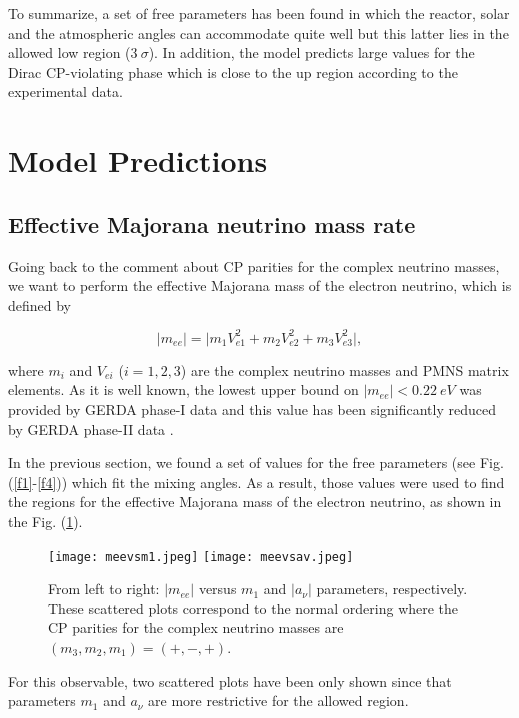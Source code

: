 \documentclass[aps,prd,groupaddress,floatfix,tighten,nofootinbib,showpacs,amsfonts,superscriptaddress]{revtex4-2}
\begin{document}
To summarize, a set of free parameters has been found in which the reactor, solar and the atmospheric angles can accommodate quite well but this latter lies in the allowed low region ($3~\sigma$). In addition, the model predicts large values for the Dirac CP-violating phase which is close to the up region according to the experimental data.




  
\section{Model Predictions}

\subsection{Effective Majorana neutrino mass rate}

Going back to the comment about CP parities for the complex neutrino masses, we want to perform the effective Majorana mass of the electron neutrino, which is defined by

\begin{equation}
	\vert m_{ee}\vert=\vert m_{1} V^{2}_{e1}+ m_{2} V^{2}_{e2}+ m_{3} V^{2}_{e3}\vert,
\end{equation}

where $m_{i}$ and $V_{ei}$ ($i=1,2,3$) are the complex neutrino masses and PMNS matrix elements. As it is well known,  the lowest upper bound on $|m_{ee}|<0.22~eV$ was provided
by GERDA phase-I data \cite{Agostini:2013mzu} and this value has been significantly reduced by GERDA phase-II data \cite{Agostini:2017iyd}. 

In the previous section, we found a set of values for the free parameters (see Fig. (\ref{f1}-\ref{f4})) which fit the mixing angles. As a result, those values were used to find
the regions for the effective Majorana mass of the electron neutrino, as shown in the Fig. (\ref{f5}).
\begin{figure}[h!]\centering
	\texttt{[image: meevsm1.jpeg]}
	\hspace{1mm}\texttt{[image: meevsav.jpeg]}
	\caption{From left to right: $\vert m_{ee}\vert$ versus $m_{1}$ and $\vert a_{\nu} \vert$ parameters, respectively. These scattered plots correspond to the normal ordering where the CP parities for the complex neutrino masses are $(m_{3}, m_{2}, m_{1})=(+,-,+)$.}\label{f5}
\end{figure}
For this observable, two scattered plots have been only shown since that parameters $m_{1}$ and $a_{\nu}$ are more restrictive for the allowed region. 
\end{document}
